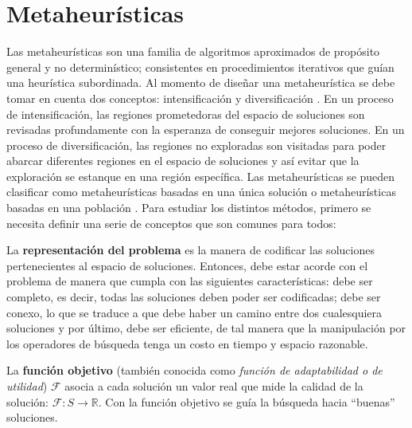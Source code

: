 \section{Metaheurísticas}


Las metaheurísticas son una familia de algoritmos aproximados de propósito general y no determinístico; consistentes en procedimientos iterativos que guían una heurística subordinada. Al momento de diseñar una metaheurística se debe tomar en cuenta dos conceptos: intensificación y diversificación \cite{talbi2009metaheuristics}. En un proceso de intensificación, las regiones prometedoras del espacio de soluciones son revisadas profundamente con la esperanza de conseguir mejores soluciones. En un proceso de diversificación, las regiones no exploradas son visitadas para poder abarcar diferentes regiones en el espacio de soluciones y así evitar que la exploración se estanque en una región específica. Las metaheurísticas se pueden clasificar como metaheurísticas basadas en una única solución o metaheurísticas basadas en una población \cite{talbi2009metaheuristics}. Para estudiar los distintos métodos, primero se necesita definir una serie de conceptos que son comunes para todos:\\

\begin{definicion}
La \textbf{representación del problema} \cite{talbi2009metaheuristics} es la manera de codificar las soluciones pertenecientes al espacio de soluciones. Entonces, debe estar acorde con el problema de manera que cumpla con las siguientes características: debe ser completo, es decir, todas las soluciones deben poder ser codificadas; debe ser conexo, lo que se traduce a que debe haber un camino entre dos cualesquiera soluciones y por último, debe ser eficiente, de tal manera que la manipulación por los operadores de búsqueda tenga un costo en tiempo y espacio razonable.\\
\end{definicion}

\begin{definicion}
La \textbf{función objetivo} \cite{talbi2009metaheuristics} (también conocida como \emph{función de adaptabilidad o de utilidad}) $\mathcal{F}$ asocia a cada solución un valor real que mide la calidad de la solución: $\mathcal{F}: S \rightarrow \mathbb{R}$. Con la función objetivo se guía la búsqueda hacia ``buenas'' soluciones.\\
\end{definicion}

